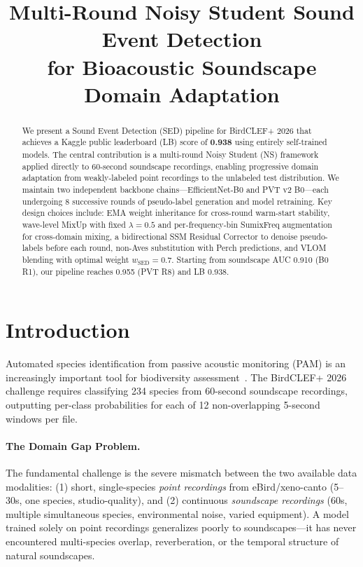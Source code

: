 \documentclass[journal]{IEEEtran}
\title{Multi-Round Noisy Student Sound Event Detection\\
for Bioacoustic Soundscape Domain Adaptation}
\author{\IEEEauthorblockN{Tom}
\IEEEauthorblockA{Realtek Semiconductor Corp.\\
Hsinchu, Taiwan}}
\begin{document}
\maketitle

\begin{abstract}
We present a Sound Event Detection (SED) pipeline for BirdCLEF+ 2026 that achieves a Kaggle public leaderboard (LB) score of \textbf{0.938} using entirely self-trained models.
The central contribution is a multi-round Noisy Student (NS) framework applied directly to 60-second soundscape recordings, enabling progressive domain adaptation from weakly-labeled point recordings to the unlabeled test distribution.
We maintain two independent backbone chains---EfficientNet-B0 and PVT v2 B0---each undergoing 8 successive rounds of pseudo-label generation and model retraining.
Key design choices include: EMA weight inheritance for cross-round warm-start stability, wave-level MixUp with fixed $\lambda=0.5$ and per-frequency-bin SumixFreq augmentation for cross-domain mixing, a bidirectional SSM Residual Corrector to denoise pseudo-labels before each round, non-Aves substitution with Perch predictions, and VLOM blending with optimal weight $w_\text{SED}=0.7$.
Starting from soundscape AUC 0.910 (B0 R1), our pipeline reaches 0.955 (PVT R8) and LB 0.938.
\end{abstract}

\section{Introduction}

Automated species identification from passive acoustic monitoring (PAM) is an increasingly important tool for biodiversity assessment~\cite{bioacoustics_review}.
The BirdCLEF+ 2026 challenge requires classifying 234 species from 60-second soundscape recordings, outputting per-class probabilities for each of 12 non-overlapping 5-second windows per file.

\paragraph{The Domain Gap Problem.}
The fundamental challenge is the severe mismatch between the two available data modalities:
(1) short, single-species \emph{point recordings} from eBird/xeno-canto (5--30s, one species, studio-quality), and
(2) continuous \emph{soundscape recordings} (60s, multiple simultaneous species, environmental noise, varied equipment).
A model trained solely on point recordings generalizes poorly to soundscapes---it has never encountered multi-species overlap, reverberation, or the temporal structure of natural soundscapes.
\end{document}
